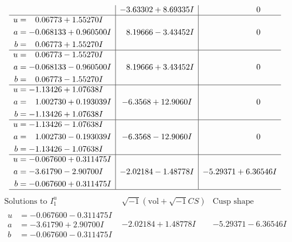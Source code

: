 \documentclass[1p]{elsarticle_modified}
\theoremstyle{definition}
\newcommand{\I}{\sqrt{-1}}
\begin{document}
$$\begin{array}{c|c|c}
 & -3.63302 + 8.69335 I & \phantom{-0.000000 } 0 \\ \hline\begin{aligned}
u &= \phantom{-}0.06773 + 1.55270 I \\
a &= -0.068133 + 0.960500 I \\
b &= \phantom{-}0.06773 + 1.55270 I\end{aligned}
 & \phantom{-}8.19666 - 3.43452 I & \phantom{-0.000000 } 0 \\ \hline\begin{aligned}
u &= \phantom{-}0.06773 - 1.55270 I \\
a &= -0.068133 - 0.960500 I \\
b &= \phantom{-}0.06773 - 1.55270 I\end{aligned}
 & \phantom{-}8.19666 + 3.43452 I & \phantom{-0.000000 } 0 \\ \hline\begin{aligned}
u &= -1.13426 + 1.07638 I \\
a &= \phantom{-}1.002730 + 0.193039 I \\
b &= -1.13426 + 1.07638 I\end{aligned}
 & -6.3568 + 12.9060 I & \phantom{-0.000000 } 0 \\ \hline\begin{aligned}
u &= -1.13426 - 1.07638 I \\
a &= \phantom{-}1.002730 - 0.193039 I \\
b &= -1.13426 - 1.07638 I\end{aligned}
 & -6.3568 - 12.9060 I & \phantom{-0.000000 } 0 \\ \hline\begin{aligned}
u &= -0.067600 + 0.311475 I \\
a &= -3.61790 - 2.90700 I \\
b &= -0.067600 + 0.311475 I\end{aligned}
 & -2.02184 - 1.48778 I & -5.29371 + 6.36546 I\\
 \hline 
 \end{array}$$\newpage$$\begin{array}{c|c|c}  
\text{Solutions to }I^u_{1}& \I (\text{vol} + \sqrt{-1}CS) & \text{Cusp shape}\\
 \hline 
\begin{aligned}
u &= -0.067600 - 0.311475 I \\
a &= -3.61790 + 2.90700 I \\
b &= -0.067600 - 0.311475 I\end{aligned}
 & -2.02184 + 1.48778 I & -5.29371 - 6.36546 I \\ \hline\begin{aligned}

\end{aligned}
\end{array}$$
\end{document}
